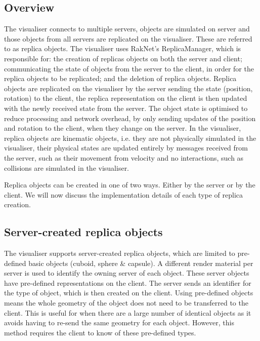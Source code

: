 \subsection{Overview}
The visualiser connects to multiple servers, objects are simulated on server and those objects from all servers are replicated on the visualiser. These are referred to as replica objects. The visualiser uses RakNet's ReplicaManager, which is responsible for: the creation of replicas objects on both the server and client; communicating the state of objects from the server to the client, in order for the replica objects to be replicated; and the deletion of replica objects. Replica objects are replicated on the visualiser by the server sending the state (position, rotation) to the client, the replica representation on the client is then updated with the newly received state from the server. The object state is optimised to reduce processing and network overhead, by only sending updates of the position and rotation to the client, when they change on the server. In the visualiser, replica objects are kinematic objects, i.e. they are not physically simulated in the visualiser, their physical states are updated entirely by messages received from the server, such as their movement from velocity and no interactions, such as collisions are simulated in the visualiser.

Replica objects can be created in one of two ways. Either by the server or by the client. We will now discuss the implementation details of each type of replica creation.

\subsection{Server-created replica objects}\label{Server-CreatedReplicas}
The visualiser supports server-created replica objects, which are limited to pre-defined basic objects (cuboid, sphere \& capsule). A different render material per server is used to identify the owning server of each object. These server objects have pre-defined representations on the client. The server sends an identifier for the type of object, which is then created on the client. Using pre-defined objects means the whole geometry of the object does not need to be transferred to the client. This is useful for when there are a large number of identical objects as it avoids having to re-send the same geometry for each object. However, this method requires the client to know of these pre-defined types.

